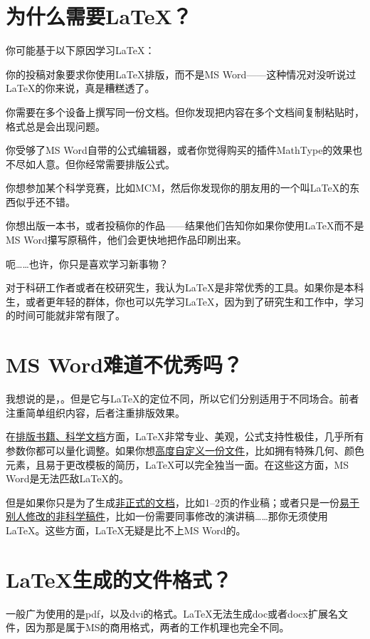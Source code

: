 \section{为什么需要\LaTeX ？}
你可能基于以下原因学习\LaTeX ：
\begin{feae}
\item 你的投稿对象要求你使用\LaTeX 排版，而不是MS Word——这种情况对没听说过\LaTeX 的你来说，真是糟糕透了。
\item 你需要在多个设备上撰写同一份文档。但你发现把内容在多个文档间复制粘贴时，格式总是会出现问题。
\item 你受够了MS Word自带的公式编辑器，或者你觉得购买的插件MathType的效果也不尽如人意。但你经常需要排版公式。
\item 你想参加某个科学竞赛，比如MCM，然后你发现你的朋友用的一个叫\LaTeX 的东西似乎还不错。
\item 你想出版一本书，或者投稿你的作品——结果他们告知你如果你使用\LaTeX 而不是MS Word攥写原稿件，他们会更快地把作品印刷出来。
\item 呃……也许，你只是喜欢学习新事物？
\end{feae}

对于科研工作者或者在校研究生，我认为\LaTeX 是非常优秀的工具。如果你是本科生，或者更年轻的群体，你也可以先学习\LaTeX ，因为到了研究生和工作中，学习的时间可能就非常有限了。

\section{MS Word难道不优秀吗？}
我想说的是，。但是它与\LaTeX 的定位不同，所以它们分别适用于不同场合。前者注重简单组织内容，后者注重排版效果。

在\uline{排版书籍、科学文档}方面，\LaTeX 非常专业、美观，公式支持性极佳，几乎所有参数你都可以量化调整。如果你想\uline{高度自定义一份文件}，比如拥有特殊几何、颜色元素，且易于更改模板的简历，\LaTeX 可以完全独当一面。在这些这方面，MS Word是无法匹敌\LaTeX 的。

但是如果你只是为了生成\uline{非正式的文档}，比如1--2页的作业稿；或者只是一份\uline{易于别人修改的非科学稿件}，比如一份需要同事修改的演讲稿……那你无须使用\LaTeX 。这些方面，\LaTeX 无疑是比不上MS Word的。

\section{\LaTeX 生成的文件格式？}
一般广为使用的是pdf，以及dvi的格式。\LaTeX 无法生成doc或者docx扩展名文件，因为那是属于MS的商用格式，两者的工作机理也完全不同。

